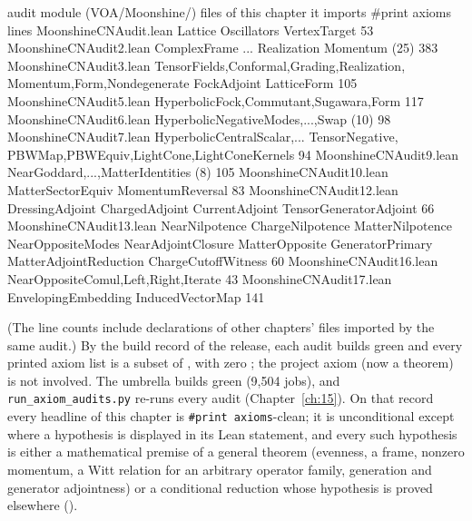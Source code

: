 \begin{plaincode}
audit module (VOA/Moonshine/)   files of this chapter it imports            #print axioms lines
MoonshineCNAudit.lean           Lattice Oscillators VertexTarget            53
MoonshineCNAudit2.lean          ComplexFrame ... Realization Momentum (25)  383
MoonshineCNAudit3.lean          Tensor{Fields,Conformal,Grading,Realization,
                                Momentum,Form,Nondegenerate} FockAdjoint
                                LatticeForm                                 105
MoonshineCNAudit5.lean          Hyperbolic{Fock,Commutant,Sugawara,Form}    117
MoonshineCNAudit6.lean          Hyperbolic{NegativeModes,...,Swap} (10)     98
MoonshineCNAudit7.lean          Hyperbolic{CentralScalar,...} Tensor{Negative,
                                PBWMap,PBWEquiv,LightCone,LightConeKernels} 94
MoonshineCNAudit9.lean          Near{Goddard,...,MatterIdentities} (8)      105
MoonshineCNAudit10.lean         MatterSectorEquiv MomentumReversal          83
MoonshineCNAudit12.lean         DressingAdjoint ChargedAdjoint CurrentAdjoint
                                TensorGeneratorAdjoint                      66
MoonshineCNAudit13.lean         NearNilpotence ChargeNilpotence MatterNilpotence
                                NearOppositeModes NearAdjointClosure
                                MatterOpposite GeneratorPrimary
                                MatterAdjointReduction ChargeCutoffWitness  60
MoonshineCNAudit16.lean         NearOpposite{Comul,Left,Right,Iterate}      43
MoonshineCNAudit17.lean         EnvelopingEmbedding InducedVectorMap        141
\end{plaincode}

\noindent (The line counts include declarations of other chapters' files imported by the same audit.)  By the build record of the release, each audit builds green
and every printed axiom list is a subset of , with zero ; the
project axiom  (now a theorem) is not involved.  The umbrella  builds green (9,504 jobs), and \texttt{run\_axiom\_audits.py} re-runs every audit (Chapter~\ref{ch:15}).  On that
record every headline of this chapter is \texttt{\#print axioms}-clean; it is unconditional
except where a hypothesis is displayed in its Lean statement, and every such hypothesis is either a mathematical premise of a
general theorem (evenness, a frame, nonzero momentum, a Witt relation for an arbitrary operator family, generation and
generator adjointness) or a conditional reduction whose hypothesis is proved elsewhere ().

